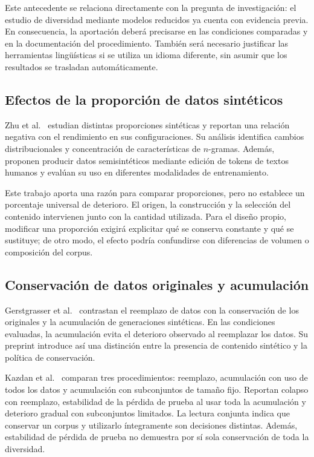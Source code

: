 \documentclass[12pt,letterpaper]{article}
\begin{document}
Este antecedente se relaciona directamente con la pregunta de investigación:
el estudio de diversidad mediante modelos reducidos ya cuenta con evidencia
previa. En consecuencia, la aportación deberá precisarse en las condiciones
comparadas y en la documentación del procedimiento. También será necesario
justificar las herramientas lingüísticas si se utiliza un idioma diferente,
sin asumir que los resultados se trasladan automáticamente.

\subsection{Efectos de la proporción de datos sintéticos}

Zhu et al.\ \cite{zhu2025} estudian distintas proporciones sintéticas y
reportan una relación negativa con el rendimiento en sus configuraciones.
Su análisis identifica cambios distribucionales y concentración de
características de \(n\)-gramas. Además, proponen producir datos
semisintéticos mediante edición de tokens de textos humanos y evalúan
su uso en diferentes modalidades de entrenamiento.

Este trabajo aporta una razón para comparar proporciones, pero no establece
un porcentaje universal de deterioro. El origen, la construcción y la
selección del contenido intervienen junto con la cantidad utilizada.
Para el diseño propio, modificar una proporción exigirá explicitar qué
se conserva constante y qué se sustituye; de otro modo, el efecto podría
confundirse con diferencias de volumen o composición del corpus.

\subsection{Conservación de datos originales y acumulación}

Gerstgrasser et al.\ \cite{gerstgrasser2024} contrastan el reemplazo de datos
con la conservación de los originales y la acumulación de generaciones
sintéticas. En las condiciones evaluadas, la acumulación evita el deterioro
observado al reemplazar los datos. Su preprint introduce así una distinción
entre la presencia de contenido sintético y la política de conservación.

Kazdan et al.\ \cite{kazdan2025} comparan tres procedimientos: reemplazo,
acumulación con uso de todos los datos y acumulación con subconjuntos de
tamaño fijo. Reportan colapso con reemplazo, estabilidad de la pérdida de
prueba al usar toda la acumulación y deterioro gradual con subconjuntos
limitados. La lectura conjunta indica que conservar un corpus y utilizarlo
íntegramente son decisiones distintas. Además, estabilidad de pérdida de
prueba no demuestra por sí sola conservación de toda la diversidad.
\end{document}
